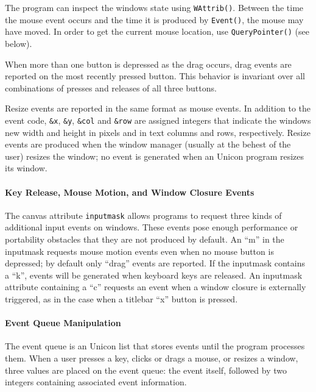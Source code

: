 The program can inspect the window{\textquotesingle}s
state using \texttt{WAttrib()}. Between the time the mouse event
occurs and the time it is produced by \texttt{Event()}, the mouse may
have moved. In order to get the current mouse location, use
\texttt{QueryPointer()} (see below).

When more than one button is depressed as the drag occurs, drag events
are reported on the most recently pressed button. This behavior is
invariant over all combinations of presses and releases of all three buttons.

Resize events are reported in the same format as mouse events.
In addition to the event code, \texttt{\&x}, \texttt{\&y}, \texttt{\&col} and
\texttt{\&row} are assigned integers that indicate the window{\textquotesingle}s
new width and height in pixels and in text columns and rows,
respectively. Resize events are produced when the window manager
(usually at the behest of the user) resizes the window; no event is
generated when an Unicon program resizes its window.

\paragraph{Key Release, Mouse Motion, and Window Closure Events}
The canvas attribute \texttt{inputmask} allows programs to request three kinds
of additional input events on windows. These events pose enough
performance or portability obstacles that they are not produced by
default. An {\textquotedblleft}m{\textquotedblright} in the inputmask
requests mouse motion events even when no mouse button is depressed; by default only
{\textquotedblleft}drag{\textquotedblright} events are reported. If the
inputmask contains a {\textquotedblleft}k{\textquotedblright}, events
will be generated when keyboard keys are released. An inputmask
attribute containing a {\textquotedblleft}c{\textquotedblright}
requests an event when a window closure is externally triggered,
as in the case when a titlebar
{\textquotedblleft}x{\textquotedblright} button is pressed.

\paragraph{Event Queue Manipulation}
The event queue is an Unicon list that stores events until the program
processes them. When a user presses a key, clicks or drags a mouse,
or resizes a window, three values are placed on the event queue: the
event itself, followed by two integers containing associated event
information.

